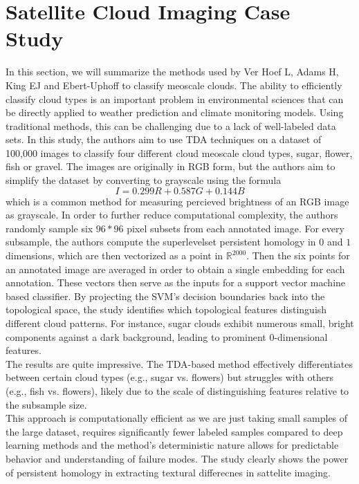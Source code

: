 \documentclass[12pt]{exam}
\begin{document}
\section{Satellite Cloud Imaging Case Study}

In this section, we will summarize the methods used by Ver Hoef L, Adams H, King EJ and Ebert-Uphoff to classify meoscale clouds. The ability to efficiently classify cloud types is an important problem in environmental sciences that can be directly applied to weather prediction and climate monitoring models. Using traditional methods, this can be challenging due to a lack of well-labeled data sets. In this study, the authors aim to use TDA techniques on a dataset of 100,000 images to classify four different cloud meoscale cloud types, sugar, flower, fish or gravel.  The images are originally in RGB form, but the authors aim to simplify the dataset by converting to grayscale using the formula
\[
I = 0.299R + 0.587G + 0.144B
\]
which is a common method for measuring percieved brightness of an RGB image as grayscale. In order to further reduce computational complexity, the authors randomly sample six $96 * 96$ pixel subsets from each annotated image. For every subsample, the authors compute the superlevelset persistent homology in $0$ and $1$ dimensions, which are then vectorized as a point in $\mathbb{R}^{2000}$. Then the six points for an annotated image are averaged in order to obtain a single embedding for each annotation. These vectors then serve as the inputs for a support vector machine based classifier. By projecting the SVM's decision boundaries back into the topological space, the study identifies which topological features distinguish different cloud patterns. For instance, sugar clouds exhibit numerous small, bright components against a dark background, leading to prominent 0-dimensional features. \\

The results are quite impressive. The TDA-based method effectively differentiates between certain cloud types (e.g., sugar vs. flowers) but struggles with others (e.g., fish vs. flowers), likely due to the scale of distinguishing features relative to the subsample size. \\

This approach is computationally efficient as we are just taking small samples of the large dataset, requires significantly fewer labeled samples compared to deep learning methods and the method's deterministic nature allows for predictable behavior and understanding of failure modes. The study clearly shows the power of persistent homology in extracting textural differecnes in sattelite imaging. 
\end{document}
